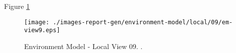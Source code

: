 
Figure \ref{fig:lu.uni.lassy.excalibur.examples.icrash-EM-view-local-09} 


\begin{figure}[htbp] 
\label{fig:lu.uni.lassy.excalibur.examples.icrash-EM}
\begin{center}
\texttt{[image: ./images-report-gen/environment-model/local/09/em-view9.eps]}
\end{center}
\caption[Environment Model - Local View 09 - ]{Environment Model - Local View 09. .}
\label{fig:lu.uni.lassy.excalibur.examples.icrash-EM-view-local-09}
\end{figure}
\vspace{0.5cm} 
